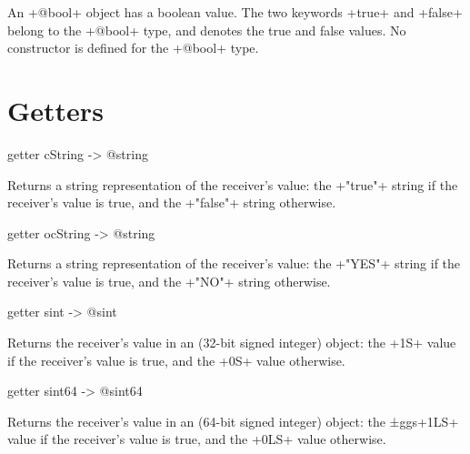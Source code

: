 

An \ggs+@bool+ object has a boolean value. The two keywords \ggs+true+ and \ggs+false+ belong to the \ggs+@bool+ type, and denotes the true and false values. No constructor is defined for the \ggs+@bool+ type.

\section{Getters}


\begin{galgas}
getter cString -> @string
\end{galgas}

Returns a string representation of the receiver's value: the \ggs+"true"+ string if the receiver's value is true, and the \ggs+"false"+ string otherwise.








\begin{galgas}
getter ocString -> @string
\end{galgas}

Returns a string representation of the receiver's value: the \ggs+"YES"+ string if the receiver's value is true, and the \ggs+"NO"+ string otherwise.





\begin{galgas}
getter sint -> @sint
\end{galgas}

Returns the receiver's value in an  (32-bit signed integer) object: the \ggs+1S+  value if the receiver's value is true, and the \ggs+0S+  value otherwise.





\begin{galgas}
getter sint64 -> @sint64
\end{galgas}

Returns the receiver's value in an  (64-bit signed integer) object: the ±ggs+1LS+  value if the receiver's value is true, and the \ggs+0LS+  value otherwise.




